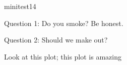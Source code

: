 \documentclass[11pt]{article}
\begin{document}
\begin{exam}{minitest1}{4}

Question 1: Do you smoke? Be honest.

\begin{figure*}[!h]
  \centering
{}
\end{figure*}

\newpage

Question 2: Should we make out?

Look at this plot; this plot is amazing

\newpage
\end{exam}
\end{document}
